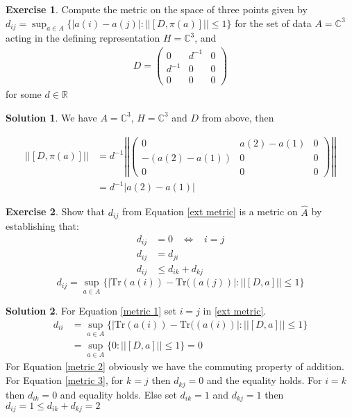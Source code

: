 \documentclass[a4paper]{article}
\theoremstyle{definition}
\theoremstyle{definition}
\theoremstyle{definition}
\theoremstyle{theorem}
\theoremstyle{theorem}
\theoremstyle{theorem}
\newtheorem{exercise}{Exercise}
\theoremstyle{definition}
\newtheorem{solution}{Solution}
\begin{document}
\begin{exercise}
	Compute the metric on the space of three points given by $d_{ij} =
	\sup_{a\in A}\{|a(i) - a(j)|: ||[D, \pi(a)]|| \leq 1\}$ for the set of data
    $A = \mathbb{C}^3$ acting in the defining representation $H = \mathbb{C}^3$, and
    \begin{align*}
    D =
    \begin{pmatrix}
        0 & d^{-1} & 0 \\
        d^{-1} & 0 & 0 \\
        0 & 0 & 0
    \end{pmatrix}
    \end{align*}
    for some $d \in \mathbb{R}$
\end{exercise}
\begin{solution}
    We have $A=\mathbb{C}^3$, $H=\mathbb{C}^3$ and $D$ from above, then

    \begin{align}
        ||[D, \pi(a)]|| &= d^{-1}\left|\left|
    \begin{pmatrix}
        0 & a(2)-a(1) & 0 \\
        -(a(2)-a(1)) & 0 & 0 \\
        0 & 0 & 0
    \end{pmatrix} \right|\right| \\
        &= d^{-1} |a(2) - a(1)|
    \end{align}
\end{solution}
\begin{exercise}
    Show that $d_{ij}$ from Equation \ref{ext metric} is a metric on $\hat{A}$ by
    establishing that:
    \begin{align}
        d_{ij} &= 0\;\;\; \Leftrightarrow \;\;\; i=j \label{metric 1} \\
        d_{ij} &= d_{ji} \label{metric 2}\\
        d_{ij} &\leq d_{ik} + d_{kj} \label{metric 3}
    \end{align}
    \begin{equation} \label{ext metric}
        d_{ij} = \sup_{a\in A}\big\{|\text{Tr}(a(i)) - \text{Tr}((a(j))|: ||[D, a]|| \leq 1\big\}
    \end{equation}
\end{exercise}
\begin{solution}
For Equation \ref{metric 1} set $i=j$ in \ref{ext metric}.
\begin{align*}
    d_{ii} &= \sup_{a \in A}\{|\text{Tr}(a(i)) - \text{Tr}((a(i))|: ||[D, a]|| \leq
    1\big\} \\
    &= \sup_{a \in A}\{0: ||[D, a]|| \leq 1\big\} = 0
\end{align*}
For Equation \ref{metric 2} obviously we have the commuting property of
addition.
\newline
For Equation \ref{metric 3}, for $k=j$ then $d_{kj} = 0$ and the equality
holds. For $i = k$ then $d_{ik} = 0$ and equality holds. Else set $d_{ik} =
1$ and $d_{kj} = 1$ then $d_{ij} = 1 \leq d_{ik} + d_{kj} = 2$
\end{solution}
\end{document}
